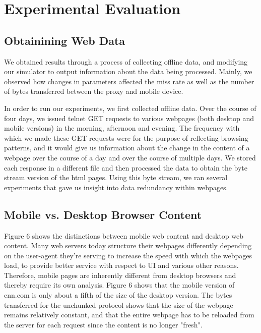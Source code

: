 \section{Experimental Evaluation}
\label{sec:eval}

\subsection{Obtainining Web Data}
We obtained results through a process of collecting offline data, and modifying our simulator to output information about the data being processed. 
Mainly, we observed how changes in parameters affected the miss rate as well as the number of bytes transferred between the proxy and mobile device.

In order to run our experiments, we first collected offline data. 
Over the course of four days, we issued telnet GET requests to various webpages (both desktop and mobile versions) in the morning, afternoon and evening. 
The frequency with which we made these GET requests were for the purpose of reflecting browsing patterns, and it would give us information about the change in the content of a webpage over the course of a day and over the course of multiple days. 
We stored each response in a different file and then processed the data to obtain the byte stream version of the html pages. 
Using this byte stream, we ran several experiments that gave us insight into data redundancy within webpages.

\subsection{Mobile vs. Desktop Browser Content}
Figure 6 shows the distinctions between mobile web content and desktop web content. 
Many web servers today structure their webpages differently depending on the user-agent they're serving to increase the speed with which the webpages load, to provide better service with respect to UI and various other reasons. 
Therefore, mobile pages are inherently different from desktop browsers and thereby require its own analysis. 
Figure 6 shows that the mobile version of cnn.com is only about a fifth of the size of the desktop version. 
The bytes transferred for the unchunked protocol shows that the size of the webpage remains relatively constant, and that the entire webpage has to be reloaded from the server for each request since the content is no longer "fresh". 

